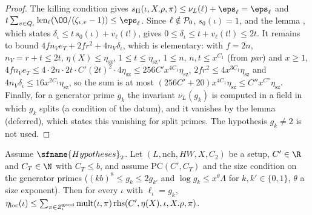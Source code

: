 \begin{proof}
The killing condition gives $\linkNselsP(\iota,X.\rho,\pi)\le\nu_L(\ell)+\eps_\ell=\eps_\ell$ and
$t\sum_{v\in Q_\iota}\linkNsellen(\OO/(\zeta_{\iota,v}-1))\le\eps_\ell$. Since $\ell\notin\mathcal P_0$, $s_0(\iota)=1$, and the lemma
, which states $\delta_\iota\le t\,s_0(\iota)+v_\ell(t!)$, gives
$0\le\delta_\iota\le t+v_\ell(t!)\le2t$. It remains to bound $4fn_Ve_T+2fr^2+4n_V\delta_\iota$, which is elementary: with $f=2n$,
$n_V=r+t\le2t$, $\eta(X)\le\eta_{\mathrm{sz}}$, $1\le t\le\eta_{\mathrm{sz}}$, $1\le n$, $n,t\le x^{C_1}$ (from \emph{par}) and $x\ge1$,
$4fn_Ve_T\le4\cdot2n\cdot2t\cdot C'(2t)^2\cdot4\eta_{\mathrm{sz}}\le256C'x^{4C_1}\eta_{\mathrm{sz}}$, $2fr^2\le4x^{3C_1}\eta_{\mathrm{sz}}$ and
$4n_V\delta_\iota\le16x^{2C_1}\eta_{\mathrm{sz}}$, so the sum is at most $(256C'+20)x^{4C_1}\eta_{\mathrm{sz}}\le C''x^{C''}\eta_{\mathrm{sz}}$.
Finally, for a generator prime $g_k$ the invariant $\nu_L(g_k)$ is computed in a field in which $g_k$ splits (a condition of the datum),
and it vanishes by the lemma  (deferred), which states this vanishing for split primes. The
hypothesis $g_k\ne2$ is not used.
\end{proof}

\begin{lemma}\label{pf:linkN-sel:etaLoc}
Assume $\sfname{Hypotheses}_2$. Let $(L,\mathrm{nch},HW,X,C_2)$ be a setup, $C'\in\R$ and $C_T\in\N$ with $C_T\le b$, and assume
$\mathrm{PC}(C',C_T)$ and the size condition on the generator primes ($(kb)^8\le g_k\le2g_{k'}$ and $\log g_k\le x^{\theta}\Lambda$ for
$k,k'\in\{0,1\}$, $\theta$ a size exponent). Then for every $\iota$ with $\ell_\iota=g_k$,
$\eta_{\mathrm{loc}}(\iota)\le\sum_{\pi\in Z^{\mathrm{good}}_\iota}\mathrm{mult}(\iota,\pi)\,\mathrm{rhs}(C',\eta(X),\iota,X.\rho,\pi)$.
\end{lemma}

